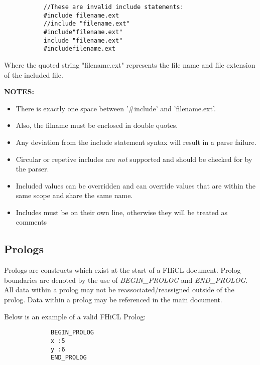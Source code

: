 \documentclass{memarticle}
\begin{document}
{\begin{verbatim}
           //These are invalid include statements:
           #include filename.ext
           //include "filename.ext"
           #include"filename.ext"
           include "filename.ext"
           #includefilename.ext
                        \end{verbatim}
                        \par
                        Where the quoted string "filename.ext" represents the file name and file extension of the included file.
                        \par
                        \textbf{ NOTES: }
                        \begin{itemize}
                           \item There is exactly one space between '\#include' and 'filename.ext'.
                           \item Also, the filname must be enclosed in double quotes.
                           \item Any deviation from the include statement syntax will result in a parse failure.
                           \item Circular or repetive includes are \emph{not} supported
                                 and should be checked for by the parser.
                           \item Included values can be overridden
                                 and can override values that are within the same scope
                                 and share the same name.
                           \item Includes must be on their own line, otherwise they will be treated as comments
                        \end{itemize}
                \subsection{Prologs}
                        Prologs are constructs which exist at the start of a FHiCL document.
                        Prolog boundaries are denoted by the use of \emph{BEGIN\_PROLOG} and \emph{END\_PROLOG}.
                        All data within a prolog may not be reassociated/reassigned outside of the prolog.
                        Data within a prolog may be referenced in the main document.
                        \par
                        Below is an example of a valid FHiCL Prolog:
                        \begin{verbatim}
             BEGIN_PROLOG
             x :5
             y :6
             END_PROLOG
                        \end{verbatim}
}
\end{document}
